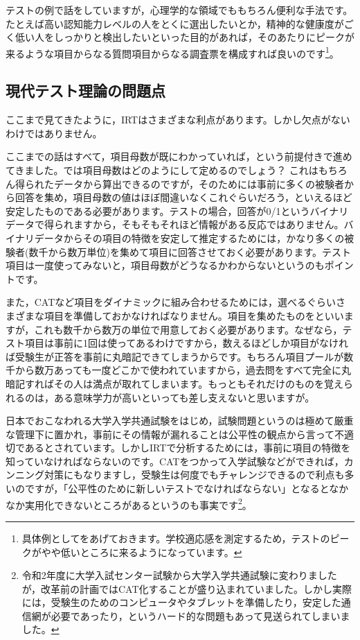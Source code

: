 \documentclass{ltjsbook}
\begin{document}
テストの例で話をしていますが，心理学的な領域でももちろん便利な手法です。たとえば高い認知能力レベルの人をとくに選出したいとか，精神的な健康度がごく低い人をしっかりと検出したいといった目的があれば，そのあたりにピークが来るような項目からなる質問項目からなる調査票を構成すれば良いのです\footnote{具体例として\textcite{kosugi120005596041}をあげておきます。学校適応感を測定するため，テストのピークがやや低いところに来るようになっています。}。


\subsection{現代テスト理論の問題点}
ここまで見てきたように，IRTはさまざまな利点があります。しかし欠点がないわけではありません。

ここまでの話はすべて，項目母数が既にわかっていれば，という前提付きで進めてきました。では項目母数はどのようにして定めるのでしょう？ これはもちろん得られたデータから算出できるのですが，そのためには事前に多くの被験者から回答を集め，項目母数の値はほぼ間違いなくこれぐらいだろう，といえるほど安定したものである必要があります。テストの場合，回答が0/1というバイナリデータで得られますから，そもそもそれほど情報がある反応ではありません。バイナリデータからその項目の特徴を安定して推定するためには，かなり多くの被験者(数千から数万単位)を集めて項目に回答させておく必要があります。テスト項目は一度使ってみないと，項目母数がどうなるかわからないというのもポイントです。

また，CATなど項目をダイナミックに組み合わせるためには，選べるぐらいさまざまな項目を準備しておかなければなりません。項目を集めたものをといいますが，これも数千から数万の単位で用意しておく必要があります。なぜなら，テスト項目は事前に1回は使ってあるわけですから，数えるほどしか項目がなければ受験生が正答を事前に丸暗記できてしまうからです。もちろん項目プールが数千から数万あっても一度どこかで使われていますから，過去問をすべて完全に丸暗記すればその人は満点が取れてしまいます。もっともそれだけのものを覚えられるのは，ある意味学力が高いといっても差し支えないと思いますが。

日本でおこなわれる大学入学共通試験をはじめ，試験問題というのは極めて厳重な管理下に置かれ，事前にその情報が漏れることは公平性の観点から言って不適切であるとされています。しかしIRTで分析するためには，事前に項目の特徴を知っていなければならないのです。CATをつかって入学試験などができれば，カンニング対策にもなりますし，受験生は何度でもチャレンジできるので利点も多いのですが，「公平性のために新しいテストでなければならない」となるとなかなか実用化できないところがあるというのも事実です\footnote{令和2年度に大学入試センター試験から大学入学共通試験に変わりましたが，改革前の計画ではCAT化することが盛り込まれていました。しかし実際には，受験生のためのコンピュータやタブレットを準備したり，安定した通信網が必要であったり，というハード的な問題もあって見送られてしまいました。}。
\end{document}
